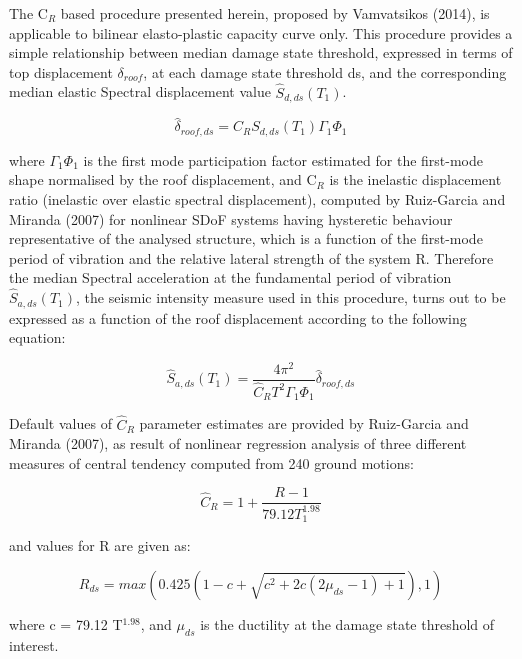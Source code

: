 The C$_R$ based procedure presented herein, proposed by Vamvatsikos (2014), is applicable to bilinear elasto-plastic capacity curve only. This procedure provides a simple relationship between median damage state threshold, expressed in terms of top displacement $\delta_{roof}$, at each damage state threshold ds, and the corresponding median elastic Spectral displacement value $\hat{S}_{d,ds}(T_1)$.

\begin{equation}
\hat{\delta}_{roof, ds} = C_R S_{d, ds}(T_1) \Gamma_1 \Phi_1
\end{equation}

where $\Gamma_1 \Phi_1$ is the first mode participation factor estimated for the first-mode shape normalised by the roof displacement, and C$_R$ is the inelastic displacement ratio (inelastic over elastic spectral displacement), computed by Ruiz-Garcia and Miranda (2007) for nonlinear SDoF systems having hysteretic behaviour representative of the analysed structure, which is a function of the first-mode period of vibration and the relative lateral strength of the system R. Therefore the median Spectral acceleration at the fundamental period of vibration $\hat{S}_{a,ds}(T_1)$, the seismic intensity measure used in this procedure, turns out to be expressed as a function of the roof displacement according to the following equation:

\begin{equation}
\hat{S}_{a,ds}(T_1) = \frac{4 \pi^2}{\hat{C}_R T^2 \Gamma_1 \Phi_1} \hat{\delta}_{roof, ds}
\label{eq:Sa_RGM}
\end{equation}

Default values of $\hat{C}_R$ parameter estimates are provided by Ruiz-Garcia and Miranda (2007), as result of nonlinear regression analysis of three different measures of central tendency computed from 240 ground motions:

\begin{equation}
\hat{C}_R = 1 + \frac{R - 1}{79.12 T_1 ^{1.98}}
\label{eq:Cr_RGM}
\end{equation}

and values for R are given as:

\begin{equation}
R_{ds} = max(0.425(1 - c + \sqrt{c^2 + 2c(2 \mu_{ds} - 1) + 1}),1)
\label{eq:R_RGM}
\end{equation}

where c = 79.12 T$^{1.98}$, and $\mu_{ds}$ is the ductility at the damage state threshold of interest.

